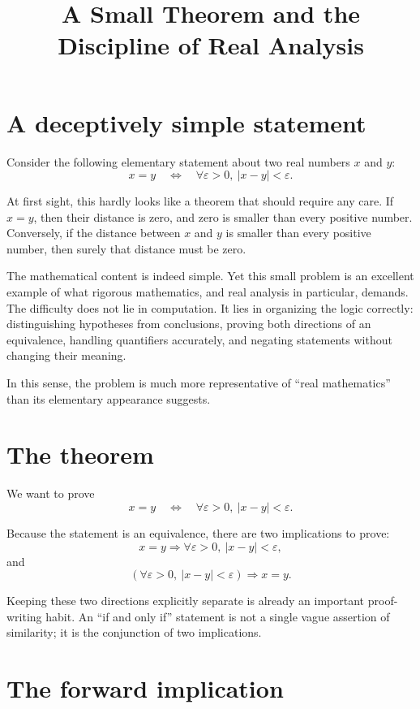 \documentclass{essay}
\title{A Small Theorem and the Discipline of Real Analysis}
\author{}
\date{}
\begin{document}
\maketitle

\section{A deceptively simple statement}

Consider the following elementary statement about two real numbers \(x\) and \(y\):
\[ x=y \quad\Longleftrightarrow\quad \forall \varepsilon>0,\ |x-y|<\varepsilon. \]

At first sight, this hardly looks like a theorem that should require any care. If \(x=y\), then their distance is zero, and zero is smaller than every positive number. Conversely, if the distance between \(x\) and \(y\) is smaller than every positive number, then surely that distance must be zero.

The mathematical content is indeed simple. Yet this small problem is an excellent example of what rigorous mathematics, and real analysis in particular, demands. The difficulty does not lie in computation. It lies in organizing the logic correctly: distinguishing hypotheses from conclusions, proving both directions of an equivalence, handling quantifiers accurately, and negating statements without changing their meaning.

In this sense, the problem is much more representative of ``real mathematics'' than its elementary appearance suggests.

\section{The theorem}

We want to prove
\[ x=y \quad\Longleftrightarrow\quad \forall \varepsilon>0,\ |x-y|<\varepsilon. \]

Because the statement is an equivalence, there are two implications to prove:
\[ x=y \Longrightarrow \forall \varepsilon>0,\ |x-y|<\varepsilon, \]
and
\[ \left(\forall \varepsilon>0,\ |x-y|<\varepsilon\right) \Longrightarrow x=y. \]

Keeping these two directions explicitly separate is already an important proof-writing habit. An ``if and only if'' statement is not a single vague assertion of similarity; it is the conjunction of two implications.

\section{The forward implication}
\end{document}
